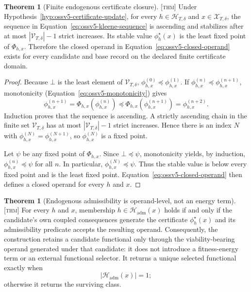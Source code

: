 \documentclass[11pt]{article}
\newcommand{\Thm}{\textsc{[thm]}}
\theoremstyle{definition}
\newtheorem{theorem}[definition]{Theorem}
\begin{document}
\begin{theorem}[Finite endogenous certificate closure]
\label{thm:ossv5-finite-closure}
\Thm{} Under Hypothesis~\ref{hyp:ossv5-certificate-update}, for every
$h\in\mathcal H_{T,\delta}$ and $x\in\mathcal X_{T,\delta}$, the sequence in
Equation~\eqref{eq:ossv5-kleene-sequence} is ascending and stabilizes after at
most $|\mathcal V_{T,\delta}|-1$ strict increases.  Its stable value
$\phi_h^\star(x)$ is the least fixed point of $\Phi_{h,x}$.  Therefore the
closed operand in Equation~\eqref{eq:ossv5-closed-operand} exists for every
candidate and base record on the declared finite certificate domain.
\end{theorem}

\begin{proof}
Because $\bot$ is the least element of $\mathcal V_{T,\delta}$,
$\phi^{(0)}_{h,x}\preceq\phi^{(1)}_{h,x}$.  If
$\phi^{(n)}_{h,x}\preceq\phi^{(n+1)}_{h,x}$, monotonicity
(Equation~\eqref{eq:ossv5-monotonicity}) gives
\begin{equation}
\phi^{(n+1)}_{h,x}
=
\Phi_{h,x}\!\left(\phi^{(n)}_{h,x}\right)
\preceq
\Phi_{h,x}\!\left(\phi^{(n+1)}_{h,x}\right)
=
\phi^{(n+2)}_{h,x}.
\end{equation}
Induction proves that the sequence is ascending.  A strictly ascending chain in
the finite set $\mathcal V_{T,\delta}$ has at most
$|\mathcal V_{T,\delta}|-1$ strict increases.  Hence there is an index $N$ with
$\phi^{(N)}_{h,x}=\phi^{(N+1)}_{h,x}$, so
$\phi^{(N)}_{h,x}$ is a fixed point.

Let $\psi$ be any fixed point of $\Phi_{h,x}$.  Since $\bot\preceq\psi$,
monotonicity yields, by induction,
$\phi^{(n)}_{h,x}\preceq\psi$ for all $n$.  In particular,
$\phi^{(N)}_{h,x}\preceq\psi$.  Thus the stable value is below every fixed
point and is the least fixed point.  Equation~\eqref{eq:ossv5-closed-operand}
then defines a closed operand for every $h$ and $x$.
\end{proof}

\begin{theorem}[Endogenous admissibility is operand-level, not an energy term]
\label{thm:ossv5-endogenous-admissibility}
\Thm{} For every $h$ and $x$, membership
$h\in\mathcal H_{\mathrm{adm}}(x)$ holds if and only if the candidate's own
coupled consequences generate the certificate $\phi_h^\star(x)$ and its
admissibility predicate accepts the resulting operand.  Consequently, the
construction retains a candidate functional only through the viability-bearing
operand generated under that candidate: it does not introduce a fitness-energy
term or an external functional selector.  It returns a unique selected
functional exactly when
\begin{equation}
\left|\mathcal H_{\mathrm{adm}}(x)\right|=1;
\label{eq:ossv5-uniqueness}
\end{equation}
otherwise it returns the surviving class.
\end{theorem}
\end{document}
